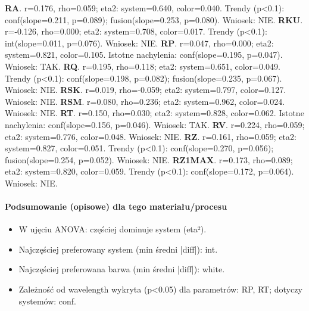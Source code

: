 \documentclass[
  10pt,
]{article}
\begin{document}
\textbf{RA}. r=0.176, rho=0.059; eta2: system=0.640, color=0.040. Trendy
(p\textless0.1): conf(slope=0.211, p=0.089); fusion(slope=0.253,
p=0.080). Wniosek: NIE. \textbf{RKU}. r=-0.126, rho=0.000; eta2:
system=0.708, color=0.017. Trendy (p\textless0.1): int(slope=0.011,
p=0.076). Wniosek: NIE. \textbf{RP}. r=0.047, rho=0.000; eta2:
system=0.821, color=0.105. Istotne nachylenia: conf(slope=0.195,
p=0.047). Wniosek: TAK. \textbf{RQ}. r=0.195, rho=0.118; eta2:
system=0.651, color=0.049. Trendy (p\textless0.1): conf(slope=0.198,
p=0.082); fusion(slope=0.235, p=0.067). Wniosek: NIE. \textbf{RSK}.
r=0.019, rho=-0.059; eta2: system=0.797, color=0.127. Wniosek: NIE.
\textbf{RSM}. r=0.080, rho=0.236; eta2: system=0.962, color=0.024.
Wniosek: NIE. \textbf{RT}. r=0.150, rho=0.030; eta2: system=0.828,
color=0.062. Istotne nachylenia: conf(slope=0.156, p=0.046). Wniosek:
TAK. \textbf{RV}. r=0.224, rho=0.059; eta2: system=0.776, color=0.048.
Wniosek: NIE. \textbf{RZ}. r=0.161, rho=0.059; eta2: system=0.827,
color=0.051. Trendy (p\textless0.1): conf(slope=0.270, p=0.056);
fusion(slope=0.254, p=0.052). Wniosek: NIE. \textbf{RZ1MAX}. r=0.173,
rho=0.089; eta2: system=0.820, color=0.059. Trendy (p\textless0.1):
conf(slope=0.172, p=0.064). Wniosek: NIE.

\paragraph{Podsumowanie (opisowe) dla tego materiału/procesu}
\begin{itemize}
\item W ujęciu ANOVA: częściej dominuje system (eta²).
\item Najczęściej preferowany system (min średni |diff|): int.
\item Najczęściej preferowana barwa (min średni |diff|): white.
\item Zależność od wavelength wykryta (p<0.05) dla parametrów: RP, RT; dotyczy systemów: conf.
\end{itemize}
\end{document}
